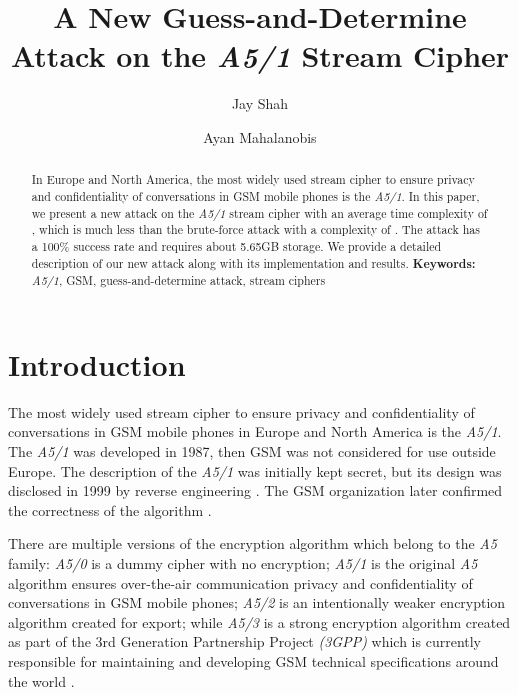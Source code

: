 \documentclass{llncs}
\begin{document}
\title{A New Guess-and-Determine Attack on the \emph {A5/1} Stream Cipher}
\author{Jay Shah \and Ayan Mahalanobis}
\maketitle
\begin{abstract}
In Europe and North America, the most widely used stream cipher to ensure privacy and confidentiality of conversations in GSM mobile phones is the \emph {A5/1}. In this paper, we present a new attack on the \emph {A5/1} stream cipher with an average time complexity of , which is much less than the brute-force attack with a complexity of . The attack has a 100\% success rate and requires about 5.65GB storage. We provide a detailed description of our new attack along with its implementation and results.
\newline
\textbf{Keywords:} \emph{A5/1}, GSM, guess-and-determine attack, stream ciphers
\end{abstract}

\section{Introduction}
The most widely used stream cipher to ensure privacy and confidentiality of conversations in GSM mobile phones in Europe and North America is the \emph {A5/1}. The \emph {A5/1} was developed in 1987, then GSM was not  considered for use outside Europe. The description of the \emph {A5/1} was initially kept secret, but its design was disclosed in 1999 by reverse engineering \cite{[Bri]}. The GSM organization later confirmed the correctness of the algorithm \cite{[Bir]}.

There are multiple versions of the encryption algorithm which belong to the \emph {A5} family: \emph {A5/0} is a dummy cipher with no encryption; \emph {A5/1} is the original \emph {A5} algorithm ensures over-the-air communication privacy and confidentiality of conversations in GSM mobile phones; \emph {A5/2} is an intentionally weaker encryption algorithm created for export; while \emph {A5/3} is a strong encryption algorithm created as part of the 3rd Generation Partnership Project \emph{(3GPP)} which is currently responsible for maintaining and developing GSM technical specifications around the world \cite{[Hill]}.
\end{document}
